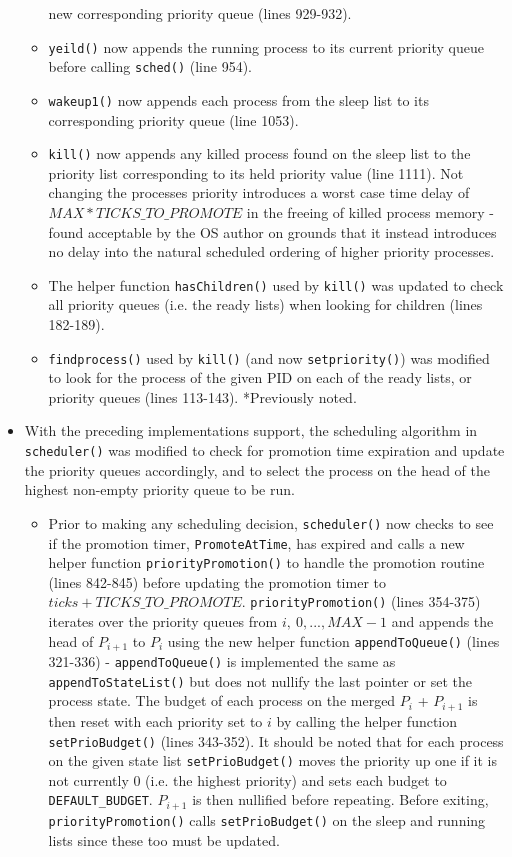\documentclass[11pt,letterpaper]{report}
\begin{document}
\begin{itemize}
\begin{itemize}
					new corresponding priority queue (lines 929-932).
				\item {\tt yeild()} now appends the running process to its current priority queue before calling {\tt sched()} (line 954).
				\item {\tt wakeup1()} now appends each process from the sleep list to its corresponding priority queue (line 1053).
				\item {\tt kill()} now appends any killed process found on the sleep list to the priority list corresponding to its held priority value (line 1111).  
				Not changing the processes priority introduces a worst case time delay of 
					$MAX*TICKS\_TO\_PROMOTE$ in the freeing of killed process memory - found acceptable by the OS author on grounds that it instead introduces no delay into
					the natural scheduled ordering of higher priority processes.

				\item The helper function {\tt hasChildren()} used by {\tt kill()} 
					was updated to check all priority queues (i.e. the ready lists) when looking for children (lines 182-189).			
					\item {\tt findprocess()} used by {\tt kill()} (and now {\tt setpriority()}) was modified to look for the process of the given PID on each of the ready lists, or priority queues 
					(lines 113-143). *Previously noted.			
			\end{itemize} 
		\item With the preceding implementations support, the scheduling algorithm in {\tt scheduler()} was modified to check for promotion time expiration and update the priority queues
			accordingly, and to select the process on the head of the highest non-empty priority queue to be run.
			\begin{itemize}
				\item Prior to making any scheduling decision, {\tt scheduler()} now checks to see if the promotion timer, {\tt PromoteAtTime}, has expired and calls a new helper function
				{\tt priorityPromotion()} to handle the promotion routine (lines 842-845) before updating the promotion timer to $ticks+TICKS\_TO\_PROMOTE$. 
				{\tt priorityPromotion()} (lines 354-375) iterates over the priority queues from $i,\ 0,...,MAX-1$ 
				and appends the head of $P_{i+1}$ to $P_{i}$ using the new helper function {\tt appendToQueue()} (lines 321-336) - {\tt appendToQueue()} is implemented
				the same as {\tt appendToStateList()} but does not nullify the last pointer or set the process state. The budget of each process on the merged $P_{i}$ + $P_{i+1}$ 
				is then reset with each priority set to $i$ by calling the helper function {\tt setPrioBudget()} (lines 343-352). It should be noted that for each process on the given state list
				{\tt setPrioBudget()} moves the priority up one if it is not currently 0 (i.e. the highest priority) and sets each budget to {\tt DEFAULT\_BUDGET}.
				$P_{i+1}$ is then nullified before repeating. Before exiting, {\tt priorityPromotion()} calls {\tt setPrioBudget()} on the sleep and running lists since these too must 
				be updated. 
				

\end{itemize}
\end{itemize}
\end{document}
